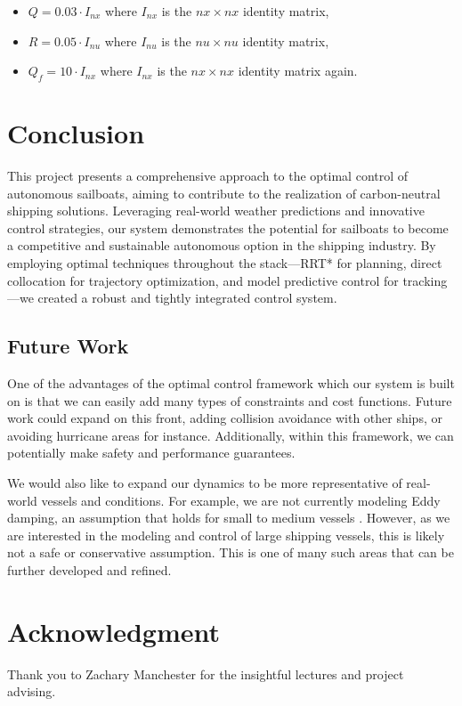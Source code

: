 \documentclass[conference]{IEEEtran}
\begin{document}
\begin{itemize}
    \item \( Q = 0.03 \cdot I_{nx} \) where \( I_{nx} \) is the \( nx \times nx \) identity matrix,
    \item \( R = 0.05 \cdot I_{nu} \) where \( I_{nu} \) is the \( nu \times nu \) identity matrix,
    \item \( Q_f = 10 \cdot I_{nx} \) where \( I_{nx} \) is the \( nx \times nx \) identity matrix again.
\end{itemize}

\section{Conclusion}
This project presents a comprehensive approach to the optimal control of autonomous sailboats, aiming to contribute to the realization of carbon-neutral shipping solutions. Leveraging real-world weather predictions and innovative control strategies, our system demonstrates the potential for sailboats to become a competitive and sustainable autonomous option in the shipping industry. By employing optimal techniques throughout the stack---RRT* for planning, direct collocation for trajectory optimization, and model predictive control for tracking---we created a robust and tightly integrated control system.

\subsection{Future Work}

One of the advantages of the optimal control framework which our system is built on is that we can easily add many types of constraints and cost functions. Future work could expand on this front, adding collision avoidance with other ships, or avoiding hurricane areas for instance. Additionally, within this framework, we can potentially make safety and performance guarantees.

We would also like to expand our dynamics to be more representative of real-world vessels and conditions. For example, we are not currently modeling Eddy damping, an assumption that holds for small to medium vessels \cite{ModelingCourseControl}. However, as we are interested in the modeling and control of large shipping vessels, this is likely not a safe or conservative assumption. This is one of many such areas that can be further developed and refined.

\section*{Acknowledgment}
Thank you to Zachary Manchester for the insightful lectures and project advising.
\end{document}

